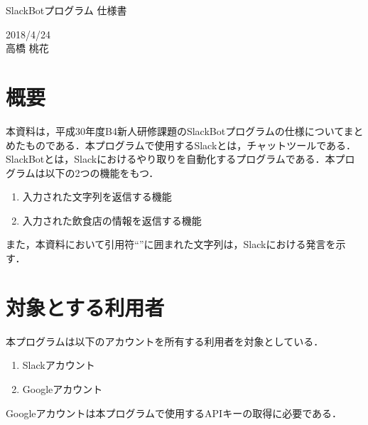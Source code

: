 \documentclass[12pt]{jsarticle}
\begin{document}
\begin{center}
{\LARGE SlackBotプログラム 仕様書}
\end{center}

\begin{flushright}
  2018/4/24\\
  高橋 桃花
\end{flushright}
\section{概要}
\label{sec:introduction}
本資料は，平成30年度B4新人研修課題のSlackBotプログラムの仕様についてまとめたものである．本プログラムで使用するSlack\cite{slack}とは，チャットツールである．SlackBotとは，Slackにおけるやり取りを自動化するプログラムである．本プログラムは以下の2つの機能をもつ．

\begin{enumerate}
\item 入力された文字列を返信する機能
\item 入力された飲食店の情報を返信する機能
\end{enumerate}

また，本資料において引用符``''に囲まれた文字列は，Slackにおける発言を示す．

\section{対象とする利用者}
\label{sec:target_users}
本プログラムは以下のアカウントを所有する利用者を対象としている．

\begin{enumerate}
\item Slackアカウント
\item Googleアカウント
\end{enumerate}
Googleアカウントは本プログラムで使用するAPIキーの取得に必要である．
\end{document}
